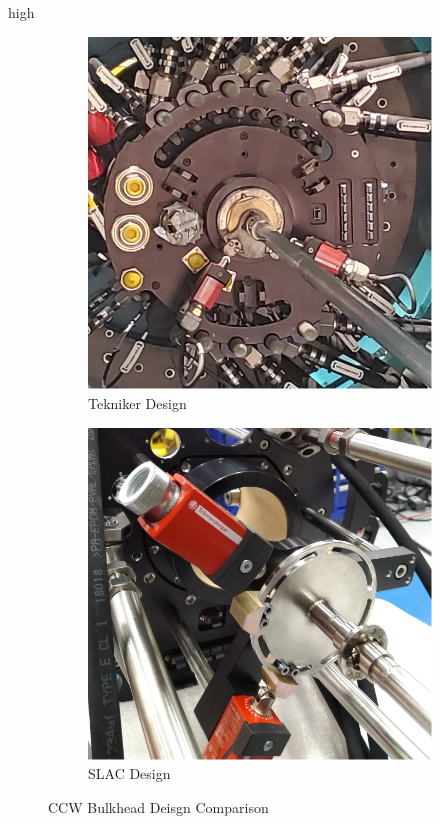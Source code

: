 high\documentclass[SE,lsstdraft,authoryear,toc]{lsstdoc}
\begin{document}
\begin{figure}[h!]
  \centering
  \begin{subfigure}{0.45\linewidth}
    \centering
    \includegraphics[width=\linewidth]{media/teknikerDesign.png}
    \caption{Tekniker Design}
  \end{subfigure}
  \begin{subfigure}{0.45\linewidth}
    \centering
    \includegraphics[width=\linewidth]{media/slacDesign.png}
    \caption{SLAC Design}
  \end{subfigure}
  \caption{CCW Bulkhead Deisgn Comparison}
  \label{fig:Figure_3}
\end{figure}
\end{document}
